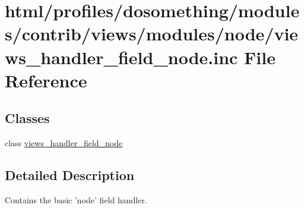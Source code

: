 \hypertarget{views__handler__field__node_8inc}{
\section{html/profiles/dosomething/modules/contrib/views/modules/node/views\_\-handler\_\-field\_\-node.inc File Reference}
\label{views__handler__field__node_8inc}
}
\subsection*{Classes}
\begin{DoxyCompactItemize}
\item 
class \hyperlink{classviews__handler__field__node}{views\_\-handler\_\-field\_\-node}
\end{DoxyCompactItemize}


\subsection{Detailed Description}
Contains the basic 'node' field handler. 